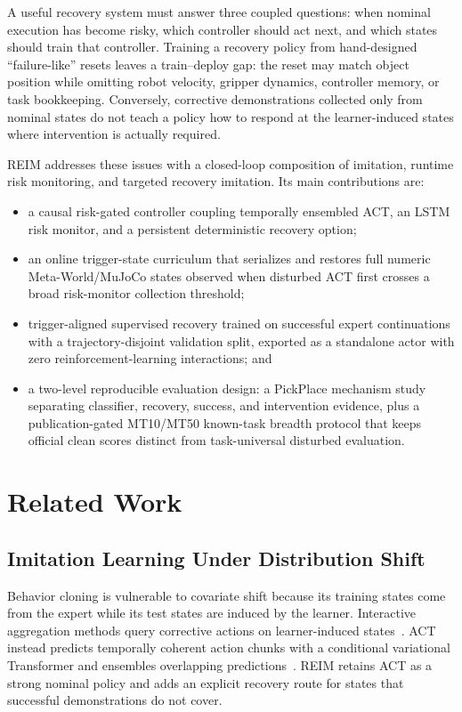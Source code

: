 \documentclass[conference]{IEEEtran}
\begin{document}
A useful recovery system must answer three coupled questions: when nominal
execution has become risky, which controller should act next, and which states
should train that controller. Training a recovery policy from hand-designed
``failure-like'' resets leaves a train--deploy gap: the reset may match object
position while omitting robot velocity, gripper dynamics, controller memory,
or task bookkeeping. Conversely, corrective demonstrations collected only
from nominal states do not teach a policy how to respond at the learner-induced
states where intervention is actually required.

REIM addresses these issues with a closed-loop composition of imitation,
runtime risk monitoring, and targeted recovery imitation. Its main
contributions are:

\begin{itemize}
  \item a causal risk-gated controller coupling temporally ensembled ACT, an
  LSTM risk monitor, and a persistent deterministic recovery option;
  \item an online trigger-state curriculum that serializes and restores full
  numeric Meta-World/MuJoCo states observed when disturbed ACT first crosses a
  broad risk-monitor collection threshold;
  \item trigger-aligned supervised recovery trained on successful expert
  continuations with a trajectory-disjoint validation split, exported as a
  standalone actor with zero reinforcement-learning interactions; and
  \item a two-level reproducible evaluation design: a PickPlace mechanism study
  separating classifier, recovery, success, and intervention evidence, plus a
  publication-gated MT10/MT50 known-task breadth protocol that keeps official
  clean scores distinct from task-universal disturbed evaluation.
\end{itemize}

\section{Related Work}
\label{sec:related}

\subsection{Imitation Learning Under Distribution Shift}

Behavior cloning is vulnerable to covariate shift because its training states
come from the expert while its test states are induced by the learner.
Interactive aggregation methods query corrective actions on learner-induced
states~\cite{ross2011dagger}. ACT instead predicts temporally coherent action
chunks with a conditional variational Transformer and ensembles overlapping
predictions~\cite{zhao2023act}. REIM retains ACT as a strong nominal policy and
adds an explicit recovery route for states that successful demonstrations do
not cover.
\end{document}
